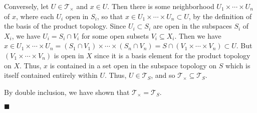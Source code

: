 \documentclass[12pt]{article}
\renewcommand{\qed}{\hfill$\blacksquare$}
\renewenvironment{proof}{\begin{addmargin}[1em]{0em}\begin{newproof}}{\end{newproof}\end{addmargin}\qed}
\begin{document}
\begin{proof}
\begin{itemize}
	Conversely, let $U\in \mathcal{T}_{\times}$ and $x\in U$. Then there is some neighborhood $U_1 \times \cdots \times U_n$ of $x$, where each $U_i$ open in $S_i$, so that $x \in U_1 \times \cdots \times U_n \subset U$, by the definition of the basis of the product topology. Since $U_i \subset S_i$ are open in the subspaces $S_i $ of $X_i$, we have $U_i = S_i \cap V_i$ for some open subsets $V_i \subseteq X_i$. Then we have $x \in U_1 \times \cdots \times U_n = \left(S_1\cap V_1\right)\times \cdots \times \left(S_n\cap V_n\right) = S\cap \left(V_1 \times \cdots \times V_n\right) \subset U$. But $\left(V_1 \times \cdots \times V_n\right)$ is open in $X$ since it is a basis element for the product topology on $X$. Thus, $x$ is contained in a set open in the subspace topology on $S$ which is itself contained entirely within $U$. Thus, $U \in \mathcal{T}_S$, and so $\mathcal{T}_{\times} \subseteq \mathcal{T}_S$.
	
By double inclusion, we have shown that $\mathcal{T}_{\times} = \mathcal{T}_S$.
	

\end{itemize}
\end{proof}
\end{document}
